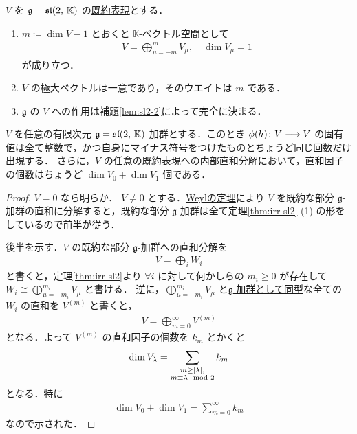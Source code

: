 \documentclass[rep_main]{subfiles}
\begin{document}
\begin{mytheo}[label=thm:irr-sl2]{}
	$V$ を $\mathfrak{g} = \mathfrak{sl}(2,\, \mathbb{K})$ の\hyperref[def:irr]{既約表現}とする．
	\begin{enumerate}
		\item $m \coloneqq \dim V - 1$ とおくと $\mathbb{K}$-ベクトル空間として
		\begin{align}
			V = \bigoplus_{\mu = -m}^m V_\mu,\quad \dim V_\mu = 1
		\end{align}
		が成り立つ．
		\item $V$ の極大ベクトルは一意であり，そのウエイトは $m$ である．
		\item $\mathfrak{g}$ の $V$ への作用は補題\ref{lem:sl2-2}によって完全に決まる．
	\end{enumerate}
\end{mytheo}

\begin{mycol}[label=col:sl2]{}
	$V$ を任意の有限次元 $\mathfrak{g} = \mathfrak{sl}(2,\, \mathbb{K})$-加群とする．このとき $\phi(h) \colon V \longrightarrow V$  の固有値は全て整数で，かつ自身にマイナス符号をつけたものとちょうど同じ回数だけ出現する．
	さらに，$V$ の任意の既約表現への内部直和分解において，直和因子の個数はちょうど $\dim V_0 + \dim V_1$ 個である．
\end{mycol}

\begin{proof}
	$V = 0$ なら明らか．
	$V \neq 0$ とする．\hyperref[thm:Weyl]{Weylの定理}により $V$ を既約な部分 $\mathfrak{g}$-加群の直和に分解すると，既約な部分 $\mathfrak{g}$-加群は全て定理\ref{thm:irr-sl2}-(1) の形をしているので前半が従う．

	後半を示す．$V$ の既約な部分 $\mathfrak{g}$-加群への直和分解を
	\begin{align}
		V = \bigoplus_i W_i
	\end{align}
	と書くと，定理\ref{thm:irr-sl2}より $\forall i$ に対して何かしらの $m_i \ge 0$ が存在して $W_i \cong \bigoplus_{\mu = -{m_i}}^{m_i} V_\mu$ と書ける．
	逆に，$\bigoplus_{\mu = -{m_i}}^{m_i} V_\mu$ と\hyperref[def:gmod-hom]{$\mathfrak{g}$-加群として同型}な全ての $W_i$ の直和を $V^{(m)}$ と書くと，
	\begin{align}
		V = \bigoplus_{m=0}^\infty V^{(m)}
	\end{align}
	となる．よって $V^{(m)}$ の直和因子の個数を $k_m$ とかくと
	\begin{align}
		\dim V_\lambda = \sum_{\substack{m \ge \abs{\lambda}, \\ m \equiv \lambda \mod 2}} k_m
	\end{align}
	となる．特に
	\begin{align}
		\dim V_0 + \dim V_1 = \sum_{m=0}^\infty k_m
	\end{align}
	なので示された．
\end{proof}
\end{document}
